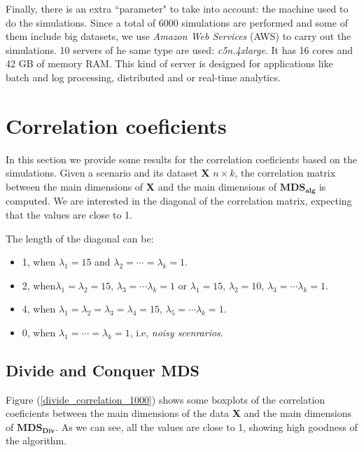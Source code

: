 \documentclass[11pt]{report}
\begin{document}
\indent Finally, there is an extra ``parameter" to take into account: the 
machine used to do the simulations. Since a total of 6000 simulations are
performed and some of them include big datasets, we use 
\textit{Amazon Web Services} (AWS) to carry out the simulations. 
10 servers of he same type are used: \textit{c5n.4xlarge}. It 
has 16 cores and 42 GB of memory RAM. This kind of server is designed for 
applications like batch and log processing, distributed and or 
real-time analytics. 


\section{Correlation coeficients}
In this section we provide some results for the correlation coeficients based
on the simulations. Given a scenario and its dataset \textbf{X} 
$n \times k$, the correlation matrix between the main dimensions of \textbf{X} 
and the main dimensions of $\mathbf{MDS_{alg}}$ is computed. We are interested
in the diagonal of the correlation matrix, expecting that the values are close
to 1.

\indent The length of the diagonal can be:

\begin{itemize}
\item 1, when  $\lambda_1 = 15$ and $\lambda_2 = \cdots = \lambda_k = 1$.

\item 2, when$\lambda_1  = \lambda_2 = 15$, $\lambda_3 = \cdots \lambda_k = 1$
or $\lambda_1  = 15$, $\lambda_2 =10$, $\lambda_3 = \cdots \lambda_k = 1$.

\item 4, when $\lambda_1  = \lambda_2 = \lambda_3 = \lambda_4 = 15$, 
$\lambda_5 = \cdots \lambda_k = 1$.

\item 0, when $\lambda_1 = \cdots = \lambda_k = 1$, i.e, 
\textit{noisy scenrarios}.

\end{itemize}


\subsection{Divide and Conquer MDS}
Figure (\ref{divide_correlation_1000}) shows some boxplots of the correlation 
coeficients between the main dimensions of the data \textbf{X} and the 
main dimensions of $\mathbf{MDS_{Div}}$. As we can see, all the values are 
close to 1, showing high goodness of the algorithm. 
\end{document}
